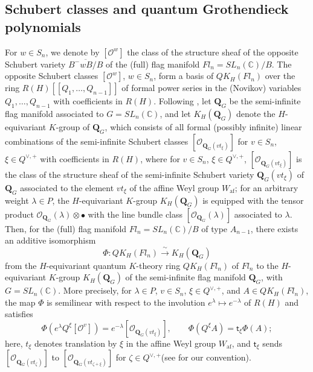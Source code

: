 \documentclass[11pt,a4paper,reqno]{amsart}
\DeclareRobustCommand{\rev}[1]{{\color{revision}#1}}
\numberwithin{equation}{section}
\theoremstyle{definition}
\newcommand{\C}{\mathbb C}
\newcommand{\QG}{\mathbf Q_G}
\newcommand{\OO}{\mathcal O}
\newcommand{\Sc}[1]{[\OO^{#1}]}
\newcommand{\Si}[1]{[\OO_{\QG(#1)}]}
\begin{document}
\subsection{Schubert classes and quantum Grothendieck polynomials}
For \(w\in S_n\), we denote by \(\Sc{w}\) the class of the structure sheaf of the opposite Schubert variety \(\overline{B^-wB/B}\) of the (full) flag manifold \(Fl_n=SL_n(\C)/B\). The opposite Schubert classes \(\Sc{w}\), \(w\in S_n\), form a basis of \(QK_H(Fl_n)\) over the ring \(R(H)[[Q_1,\ldots,Q_{n-1}]]\) of formal power series in the (Novikov) variables \(Q_1, \ldots, Q_{n-1}\) with coefficients in \(R(H)\). 
Following \cite{Kat}, let \(\QG\) be the semi-infinite flag manifold associated to \(G = SL_n(\C)\), and let \(K_{H}(\QG)\) denote the \(H\)-equivariant \(K\)-group of \(\QG\), which consists of all formal (possibly infinite) linear combinations of the semi-infinite Schubert classes \(\Si{vt_\xi}\) for \(v \in S_n\), \(\xi \in Q^{\vee,+}\) with coefficients in \(R(H)\), where 
for \(v\in S_n\), \(\xi\in Q^{\vee,+}\), \(\Si{vt_\xi}\) is the class of the structure sheaf of the semi-infinite Schubert variety \(\QG(vt_{\xi})\) of \(\QG\) associated to the element \(vt_\xi\) of the affine Weyl group \(W_{\mathrm{af}}\); for an arbitrary weight \(\lambda \in P\), the \(H\)-equivariant \(K\)-group \(K_{H}(\QG)\) is equipped with the tensor product \(\mathcal{O}_{\QG}(\lambda) \otimes \bullet\) with the line bundle class \([\mathcal{O}_{\QG}(\lambda)]\) associated to \(\lambda\).    
Then, for the (full) flag manifold \(Fl_n=SL_n(\C)/B\) of type $A_{n-1}$, there exists an additive isomorphism
\[
 \Phi\colon QK_H(Fl_n)\xrightarrow{\ \sim\ } K_H(\QG)
\]
from the \(H\)-equivariant quantum \(K\)-theory ring \(QK_H(Fl_{n})\) of \(Fl_n\) to the \(H\)-equivariant \(K\)-group \(K_{H}(\QG)\) of the semi-infinite flag manifold \(\QG\), with \(G = SL_n(\C)\).
More precisely, for \(\lambda\in P\), \(v\in S_n\), \(\xi\in Q^{\vee,+}\), and \(A \in QK_H(Fl_n)\), the map \(\Phi\) is semilinear with respect to the involution \(e^\lambda\mapsto e^{-\lambda}\) of \(R(H)\) and satisfies
\begin{equation}\label{eq:phi}
 \Phi(e^\lambda Q^\xi\Sc{v})=e^{-\lambda}\Si{vt_\xi},\qquad
 \Phi(Q^\xi A)=\mathsf t_\xi\Phi(A);
\end{equation}
\rev{here, \(t_\xi\) denotes translation by \(\xi\) in the affine Weyl group \(W_{\mathrm{af}}\), and \(\mathsf t_\xi\) sends \(\Si{vt_\zeta}\) to \(\Si{vt_{\zeta+\xi}}\) for \(\zeta \in Q^{\vee,+}\)(see \cite[\S3.1 and \S5]{MNS1} for our convention).}
\end{document}

